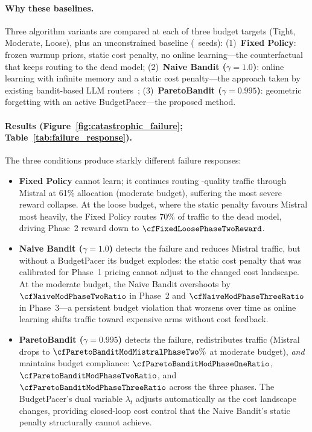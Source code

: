 \paragraph{Why these baselines.}
Three algorithm variants are compared at each of three budget targets (Tight, Moderate, Loose), plus an unconstrained baseline (\cfNseeds~seeds):
(1)~\textbf{Fixed Policy}: frozen warmup priors, static cost penalty, no online learning---the counterfactual that keeps routing to the dead model;
(2)~\textbf{Naive Bandit ($\gamma{=}1.0$)}: online learning with infinite memory and a static cost penalty---the approach taken by existing bandit-based LLM routers~\cite{panda2025pilot,wang2025barp};
(3)~\textbf{ParetoBandit ($\gamma{=}0.995$)}: geometric forgetting with an active BudgetPacer---the proposed method.

\paragraph{Results (Figure~\ref{fig:catastrophic_failure}; Table~\ref{tab:failure_response}).}
The three conditions produce starkly different failure responses:
\begin{itemize}[nosep,leftmargin=*]
  \item \textbf{Fixed Policy} cannot learn; it continues routing \cfFixedModPhaseTwoReward-quality traffic through Mistral at 61\% allocation (moderate budget), suffering the most severe reward collapse.
    At the loose budget, where the static penalty favours Mistral most heavily, the Fixed Policy routes $70\%$ of traffic to the dead model, driving Phase~2 reward down to $\cfFixedLoosePhaseTwoReward$.
  \item \textbf{Naive Bandit ($\gamma{=}1.0$)} detects the failure and reduces Mistral traffic, but without a BudgetPacer its budget explodes: the static cost penalty that was calibrated for Phase~1 pricing cannot adjust to the changed cost landscape.
    At the moderate budget, the Naive Bandit overshoots by $\cfNaiveModPhaseTwoRatio$ in Phase~2 and $\cfNaiveModPhaseThreeRatio$ in Phase~3---a persistent budget violation that worsens over time as online learning shifts traffic toward expensive arms without cost feedback.
  \item \textbf{ParetoBandit ($\gamma{=}0.995$)} detects the failure, redistributes traffic (Mistral drops to $\cfParetoBanditModMistralPhaseTwo\%$ at moderate budget), \emph{and} maintains budget compliance: $\cfParetoBanditModPhaseOneRatio$, $\cfParetoBanditModPhaseTwoRatio$, and $\cfParetoBanditModPhaseThreeRatio$ across the three phases.
    The BudgetPacer's dual variable $\lambda_t$ adjusts automatically as the cost landscape changes, providing closed-loop cost control that the Naive Bandit's static penalty structurally cannot achieve.
\end{itemize}

